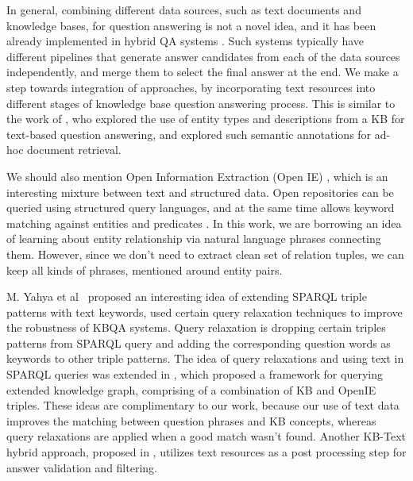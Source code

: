 In general, combining different data sources, such as text documents and knowledge bases, for question answering is not a novel idea, and it has been already implemented in hybrid QA systems \cite{baudivs2015modeling,Barker12}.
Such systems typically have different pipelines that generate answer candidates from each of the data sources independently, and merge them to select the final answer at the end.
We make a step towards integration of approaches, by incorporating text resources into different stages of knowledge base question answering process.
This is similar to the work of \cite{Sun:2015:ODQ:2736277.2741651}, who explored the use of entity types and descriptions from a KB for text-based question answering, and \cite{dalton2014entity} explored such semantic annotations for ad-hoc document retrieval.

We should also mention Open Information Extraction (Open IE) \cite{fader2011identifying}, which is an interesting mixture between text and structured data.
Open  repositories can be queried using structured query languages, and at the same time allows keyword matching against entities and predicates \cite{Fader:2014:OQA:2623330.2623677}.
In this work, we are borrowing an idea of learning about entity relationship via natural language phrases connecting them.
However, since we don't need to extract clean set of relation tuples, we can keep all kinds of phrases, mentioned around entity pairs.

M. Yahya et al~\cite{yahya2013robust} proposed an interesting idea of extending SPARQL triple patterns with text keywords, used certain query relaxation techniques to improve the robustness of KBQA systems.
Query relaxation is dropping certain triples patterns from SPARQL query and adding the corresponding question words as keywords to other triple patterns.
The idea of query relaxations and using text in SPARQL queries was extended in \cite{yahya2016relationship}, which proposed a framework for querying extended knowledge graph, comprising of a combination of KB and OpenIE triples.
These ideas are complimentary to our work, because our use of text data improves the matching between question phrases and KB concepts, whereas query relaxations are applied when a good match wasn't found.
Another KB-Text hybrid approach, proposed in \cite{xu2016enhancing}, utilizes text resources as a post processing step for answer validation and filtering.

